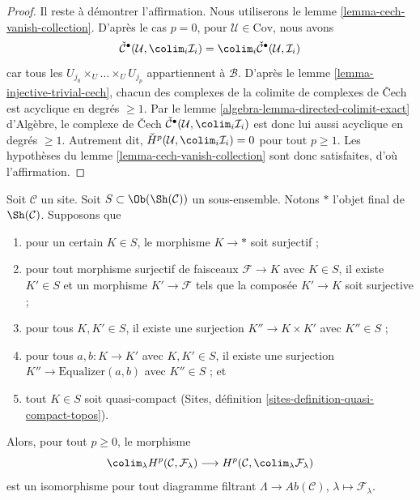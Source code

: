 \begin{proof}
\medskip\noindent
Il reste à démontrer l'affirmation. Nous utiliserons le
lemme \ref{lemma-cech-vanish-collection}.
D'après le cas $p = 0$, pour $\mathcal{U} \in \text{Cov}$, nous avons
$$
\check{\mathcal{C}}^\bullet(\mathcal{U}, \colim_i \mathcal{I}_i)
=
\colim_i \check{\mathcal{C}}^\bullet(\mathcal{U}, \mathcal{I}_i)
$$
car tous les $U_{j_0} \times_U \ldots \times_U U_{j_p}$
appartiennent à $\mathcal{B}$. D'après le
lemme \ref{lemma-injective-trivial-cech}, chacun des complexes de la colimite
de complexes de {\v C}ech est acyclique en degrés $\geq 1$. Par le
lemme \ref{algebra-lemma-directed-colimit-exact} d'Algèbre, le complexe de
{\v C}ech
$\check{\mathcal{C}}^\bullet(\mathcal{U}, \colim_i \mathcal{I}_i)$
est donc lui aussi acyclique en degrés $\geq 1$. Autrement dit,
$\check{H}^p(\mathcal{U}, \colim_i \mathcal{I}_i) = 0$
pour tout $p \geq 1$. Les hypothèses du
lemme \ref{lemma-cech-vanish-collection} sont donc satisfaites, d'où
l'affirmation.
\end{proof}

\begin{lemma}
\label{lemma-colim-global}
Soit $\mathcal{C}$ un site. Soit $S \subset \Ob(\Sh(\mathcal{C}))$
un sous-ensemble. Notons $*$ l'objet final de $\Sh(\mathcal{C})$. Supposons que
\begin{enumerate}
\item pour un certain $K \in S$, le morphisme $K \to *$ soit surjectif ;
\item pour tout morphisme surjectif de faisceaux $\mathcal{F} \to K$ avec
$K \in S$, il existe $K' \in S$ et un morphisme $K' \to \mathcal{F}$ tels
que la composée $K' \to K$ soit surjective ;
\item pour tous $K, K' \in S$, il existe une surjection
$K'' \to K \times K'$ avec $K'' \in S$ ;
\item pour tous $a, b : K \to K'$ avec $K, K' \in S$, il existe une
surjection $K'' \to \text{Equalizer}(a, b)$ avec $K'' \in S$ ; et
\item tout $K \in S$ soit quasi-compact
(Sites, définition \ref{sites-definition-quasi-compact-topos}).
\end{enumerate}
Alors, pour tout $p \geq 0$, le morphisme
$$
\colim_\lambda H^p(\mathcal{C}, \mathcal{F}_\lambda)
\longrightarrow
H^p(\mathcal{C}, \colim_\lambda \mathcal{F}_\lambda)
$$
est un isomorphisme pour tout diagramme filtrant
$\Lambda \to \textit{Ab}(\mathcal{C})$, $\lambda \mapsto \mathcal{F}_\lambda$.
\end{lemma}

